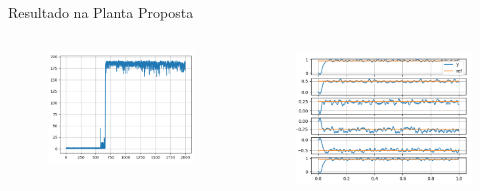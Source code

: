 \documentclass[pdf]{beamer}
\begin{document}
\begin{frame}{Resultado na Planta Proposta}
\begin{columns}
		\begin{subfigure}[t]{\textwidth}
			\centering
			\includegraphics[scale=0.6]{img/aprendizado_exp005.png}
		\end{subfigure}
		\begin{subfigure}[t]{\textwidth}
			\centering
			\includegraphics[scale=0.6]{img/resultado_exp005.png}
		\end{subfigure}
	\end{columns}
	
\end{frame}
%
%
\end{document}
